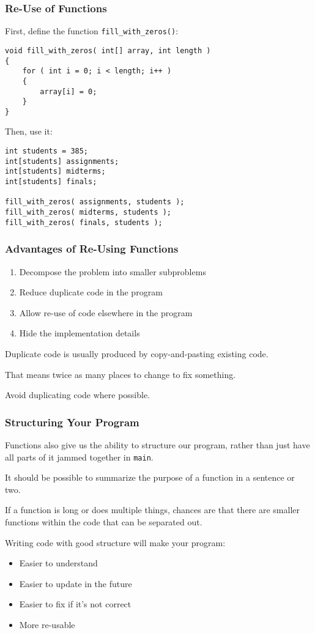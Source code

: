 \begin{frame}[fragile]
\frametitle{Re-Use of Functions}

First, define the function \texttt{fill\_with\_zeros()}:

{\scriptsize
\begin{verbatim}
void fill_with_zeros( int[] array, int length ) 
{
    for ( int i = 0; i < length; i++ )
    {
        array[i] = 0;
    }
}    
\end{verbatim}
}

Then, use it:
{\scriptsize
\begin{verbatim}
int students = 385;
int[students] assignments;
int[students] midterms;
int[students] finals;

fill_with_zeros( assignments, students );
fill_with_zeros( midterms, students );
fill_with_zeros( finals, students );
\end{verbatim}
}

\end{frame}

\begin{frame}
\frametitle{Advantages of Re-Using Functions}

\begin{enumerate}
	\item Decompose the problem into smaller subproblems
	\item Reduce duplicate code in the program
	\item Allow re-use of code elsewhere in the program
	\item Hide the implementation details
\end{enumerate}

Duplicate code is usually produced by copy-and-pasting existing code.

That means twice as many places to change to fix something.

Avoid duplicating code where possible.

\end{frame}

\begin{frame}
\frametitle{Structuring Your Program}
Functions also give us the ability to structure our program, rather than just have all parts of it jammed together in \texttt{main}.

It should be possible to summarize the purpose of a function in a sentence or two. 

If a function is long or does multiple things, chances are that there are smaller functions within the code that can be separated out. 

Writing code with good structure will make your program:
\begin{itemize}
	\item Easier to understand
	\item Easier to update in the future
	\item Easier to fix if it's not correct
	\item More re-usable
\end{itemize}

\end{frame}

